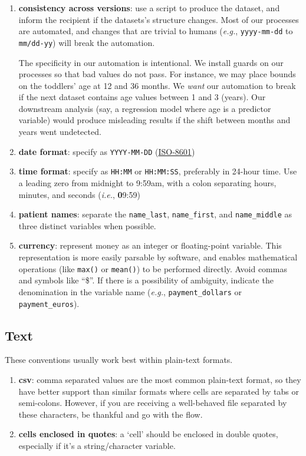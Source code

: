 \documentclass[
]{book}
\begin{document}
\begin{enumerate}
\def\labelenumi{\arabic{enumi}.}
\item
  \textbf{consistency across versions}: use a script to produce the dataset, and inform the recipient if the datasets's structure changes. Most of our processes are automated, and changes that are trivial to humans (\emph{e.g.}, \texttt{yyyy-mm-dd} to \texttt{mm/dd-yy}) will break the automation.

  The specificity in our automation is intentional. We install guards on our processes so that bad values do not pass. For instance, we may place bounds on the toddlers' age at 12 and 36 months. We \emph{want} our automation to break if the next dataset contains age values between 1 and 3 (years). Our downstream analysis (say, a regression model where age is a predictor variable) would produce misleading results if the shift between months and years went undetected.
\item
  \textbf{date format}: specify as \texttt{YYYY-MM-DD} (\href{https://www.explainxkcd.com/wiki/index.php/1179:_ISO_8601}{ISO-8601})
\item
  \textbf{time format}: specify as \texttt{HH:MM} or \texttt{HH:MM:SS}, preferably in 24-hour time. Use a leading zero from midnight to 9:59am, with a colon separating hours, minutes, and seconds (\emph{i.e.}, \textbf{0}9:59)
\item
  \textbf{patient names}: separate the \texttt{name\_last}, \texttt{name\_first}, and \texttt{name\_middle} as three distinct variables when possible.
\item
  \textbf{currency}: represent money as an integer or floating-point variable. This representation is more easily parsable by software, and enables mathematical operations (like \texttt{max()} or \texttt{mean()}) to be performed directly. Avoid commas and symbols like ``\$''. If there is a possibility of ambiguity, indicate the denomination in the variable name (\emph{e.g.}, \texttt{payment\_dollars} or \texttt{payment\_euros}).
\end{enumerate}

\hypertarget{data-conventions-text}{%
\subsection{Text}\label{data-conventions-text}}

These conventions usually work best within plain-text formats.

\begin{enumerate}
\def\labelenumi{\arabic{enumi}.}
\item
  \textbf{csv}: comma separated values are the most common plain-text format, so they have better support than similar formats where cells are separated by tabs or semi-colons. However, if you are receiving a well-behaved file separated by these characters, be thankful and go with the flow.
\item
  \textbf{cells enclosed in quotes}: a `cell' should be enclosed in double quotes, especially if it's a string/character variable.
\end{enumerate}
\end{document}
